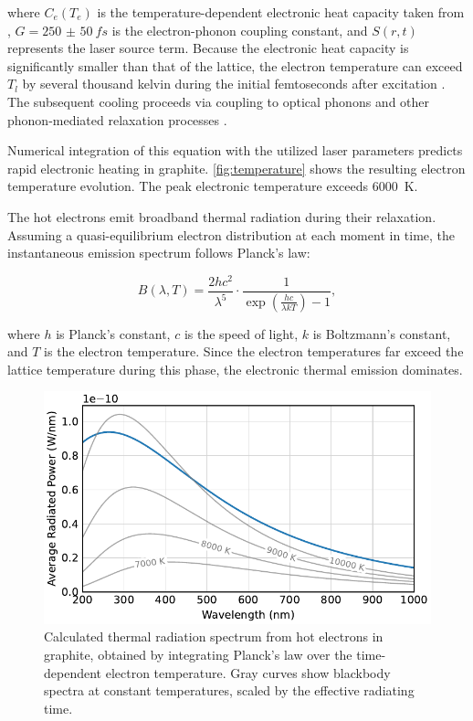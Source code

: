 \documentclass[
	parskip=half,
	a4paper,
]{scrarticle}
\begin{document}
where \( C_e(T_e) \) is the temperature-dependent electronic heat capacity taken from \cite{nihira_temperature_2003}, \( G = \SI{250(50)}{fs}\) \cite{stange_hot_2015} is the electron-phonon coupling constant, and \( S(r,t) \) represents the laser source term. Because the electronic heat capacity is significantly smaller than that of the lattice, the electron temperature can exceed \( T_l \) by several thousand kelvin during the initial femtoseconds after excitation \cite{roob_thermal_2025}. The subsequent cooling proceeds via coupling to optical phonons \cite{lui_ultrafast_2010} and other phonon-mediated relaxation processes \cite{stange_hot_2015}.

Numerical integration of this equation with the utilized laser parameters predicts rapid electronic heating in graphite. \autoref{fig:temperature} shows the resulting electron temperature evolution. The peak electronic temperature exceeds \SI{6000}{K}.

The hot electrons emit broadband thermal radiation during their relaxation. Assuming a quasi-equilibrium electron distribution at each moment in time, the instantaneous emission spectrum follows Planck’s law:

\begin{equation}
B(\lambda, T) = \frac{2hc^2}{\lambda^5} \cdot \frac{1}{\exp\left(\frac{hc}{\lambda kT}\right) - 1},
\end{equation}

where \( h \) is Planck's constant, \( c \) is the speed of light, \( k \) is Boltzmann's constant, and \( T \) is the electron temperature. Since the electron temperatures far exceed the lattice temperature during this phase, the electronic thermal emission dominates.

\begin{figure}[b]
    \centering
    \includegraphics{../analysis/figures/model spectrum.pdf}
    \caption{Calculated thermal radiation spectrum from hot electrons in graphite, obtained by integrating Planck's law over the time-dependent electron temperature. Gray curves show blackbody spectra at constant temperatures, scaled by the effective radiating time.}
    \label{fig:model_spectrum}
\end{figure}
\end{document}
